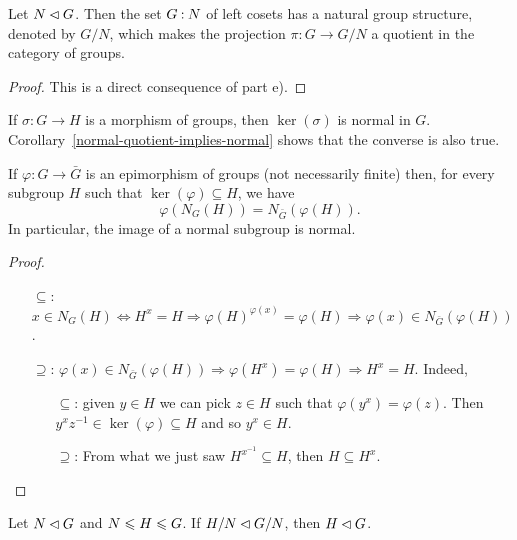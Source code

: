 \begin{cor}
    Let\/ $N\lhd G$. Then the set\/ $G\mathbin:N$ of left cosets has a natural group structure, denoted by\/ $G/N$, which makes the projection\/ $\pi\colon G\to G/N$ a quotient in the category of groups.
\end{cor}

\begin{proof} This is a direct consequence of part e).  \end{proof}


\begin{rem}
    If $\sigma\colon G\to H$ is a morphism of groups, then $\ker(\sigma)$ is normal in $G$. Corollary~\ref{normal-quotient-implies-normal} shows that the converse is also true.
\end{rem}

\begin{prop}\label{image-of-normalizer}
    If $\varphi\colon G\to \bar G$ is an epimorphism of groups (not necessarily finite) then, for every subgroup $H$ such that $\ker(\varphi)\subseteq H$, we have
    $$
        \varphi(N_{G}(H))=N_{\bar G}(\varphi(H)).
    $$
    In particular, the image of a normal subgroup is normal.
\end{prop}

\begin{proof}${}$
\begin{enumerate}
    \item[$\subseteq$:] $x\in N_{G}(H)\Leftrightarrow H^x=H\Rightarrow\varphi(H)^{\varphi(x)}=\varphi(H)\Rightarrow\varphi(x)\in N_{\bar G}(\varphi(H))$.
    \item[$\supseteq$:] $\varphi(x)\in N_{\bar G}(\varphi(H))\Rightarrow\varphi(H^x)=
    \varphi(H)\Rightarrow H^x=H$. Indeed,
    \begin{enumerate}
        \item[$\subseteq$:] given $y\in H$ we can pick $z\in H$ such that $\varphi(y^x)=\varphi(z)$. Then $y^xz^{-1}\in \ker(\varphi)\subseteq H$ and so $y^x\in H$.
        \item[$\supseteq$:] From what we just saw $H^{x^{-1}}\subseteq H$, then $H\subseteq H^x$.
    \end{enumerate}
\end{enumerate}
\end{proof}

\begin{cor}\label{normal-quotient-implies-normal}
    Let\/ $N\lhd G$ and $N\leqslant H\leqslant G$. If\/ $H/N\lhd G/N$, then\/ $H\lhd G$.
\end{cor}

